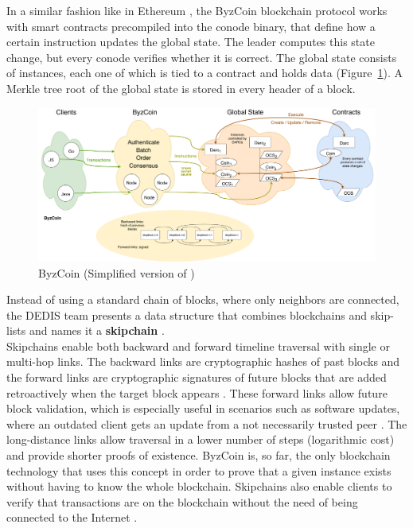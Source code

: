 \newline
In a similar fashion like in Ethereum \cite{Ethereum}, the ByzCoin blockchain protocol works with smart contracts precompiled into the conode binary, that define how a certain instruction updates the global state.  The leader computes this state change, but every conode verifies whether it is correct. The global state consists of instances, each one of which is tied to a contract and holds data (Figure~\ref{ByzCoin}). A Merkle tree \cite{Merkle} root of the global state is stored in every header of a block.\\
\begin{figure}[H]
    \centering
    \includegraphics[width=1\textwidth]{Figures/ByzCoin.pdf}
    \caption{ByzCoin (Simplified version of \cite{ByzCoin Figure})}
    \label{ByzCoin}
\end{figure}
\noindent
Instead of using a standard chain of blocks, where only neighbors are connected, the DEDIS team presents a data structure that combines
blockchains and skip-lists \cite{SkipLists} and names it a \textbf{skipchain} \cite{Chainiac}.\\
\newline
Skipchains enable both backward and forward timeline traversal with single or multi-hop links. The backward links are cryptographic hashes of past blocks and the forward links are cryptographic signatures of future blocks that are added retroactively when the target block appears \cite{Chainiac}. These forward links allow future block validation, which is especially useful in scenarios such as software updates, where an outdated client gets an update from a not necessarily trusted peer \cite{Chainiac}.
\newline
The long-distance links allow traversal in a lower number of steps (logarithmic cost) and provide shorter proofs of existence. ByzCoin is, so far, the only blockchain technology that uses this concept in order to prove that a given instance exists without having to know the whole blockchain. Skipchains also enable clients to verify that transactions are on the blockchain without the need of being connected to the Internet \cite{Chainiac}.\\
